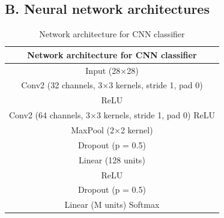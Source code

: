 \subsection*{B. Neural network architectures}\label{appendix:architectures}
\begin{table}[h]
    \centering
    \caption{Network architecture for CNN classifier}\label{tab:cnn_architecture}
    \begin{tabular}{|c|}
    \toprule[1.5pt]
    Network architecture for CNN classifier\\
    \hline
    Input (28×28)\\
    Conv2 (32 channels, 3×3 kernels, stride 1, pad 0) \\
    ReLU\\
    Conv2 (64 channels, 3×3 kernels, stride 1, pad 0) ReLU\\
    MaxPool (2×2 kernel)\\
    Dropout (p = 0.5)\\
    Linear (128 units)\\
    ReLU\\
    Dropout (p = 0.5)\\
    Linear (M units)
    Softmax\\
    \hline
    \end{tabular}


\end{table}
